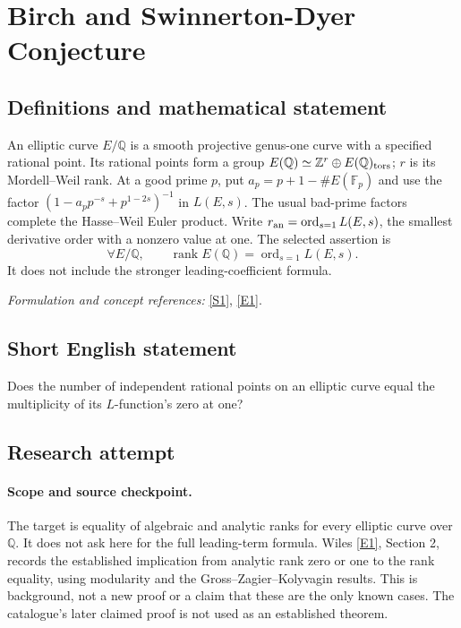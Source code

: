 \documentclass[11pt]{article}
\begin{document}
\section*{\texorpdfstring{Birch and Swinnerton-Dyer Conjecture}{Birch and Swinnerton-Dyer Conjecture}}\label{5}
\subsection{Definitions and mathematical statement}
An elliptic curve $E/{\mathbb{Q}}$ is a smooth projective genus-one curve with a specified rational point. Its rational points form a group $E({\mathbb{Q}})\simeq{\mathbb{Z}}^r\oplus E({\mathbb{Q}})_{\rm tors}$; $r$ is its Mordell--Weil rank. At a good prime $p$, put $a_p=p+1-\#E({\mathbb{F}}_p)$ and use the factor $(1-a_pp^{-s}+p^{1-2s})^{-1}$ in $L(E,s)$. The usual bad-prime factors complete the Hasse--Weil Euler product. Write $r_{\rm an}=\operatorname{ord}_{s=1}L(E,s)$, the smallest derivative order with a nonzero value at one. The selected assertion is
\[
 \forall E/{\mathbb{Q}},\qquad \operatorname{rank}E({\mathbb{Q}})=\operatorname{ord}_{s=1}L(E,s).
\]
It does not include the stronger leading-coefficient formula.
\par\smallskip\textit{Formulation and concept references:} \href{https://www.claymath.org/library/monographs/MPPc.pdf}{[S1]}, \href{https://www.claymath.org/wp-content/uploads/2022/05/birchswin.pdf}{[E1]}.

\subsection{Short English statement}
Does the number of independent rational points on an elliptic curve equal the multiplicity of its $L$-function's zero at one?
\subsection{Research attempt}

\paragraph{Scope and source checkpoint.}
The target is equality of algebraic and analytic ranks for every elliptic
curve over $\mathbb Q$. It does not ask here for the full leading-term
formula. Wiles \href{https://www.claymath.org/wp-content/uploads/2022/05/birchswin.pdf}{[E1]}, Section 2, records the established implication from
analytic rank zero or one to the rank equality, using modularity and the
Gross--Zagier--Kolyvagin results. This is background, not a new proof or a
claim that these are the only known cases. The catalogue's later claimed
proof is not used as an established theorem.
\end{document}
